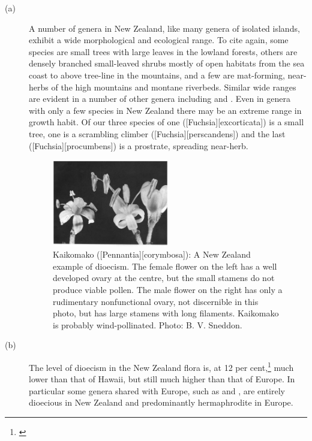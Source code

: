 \begin{description}
\item[{(a)}]A number of genera in New Zealand, like many genera of isolated islands, exhibit a wide morphological and ecological range.
To cite  again, some species are small trees with large leaves in the lowland forests, others are densely branched small-leaved shrubs mostly of open habitats from the sea coast to above tree-line in the mountains, and a few are mat-forming, near-herbs of the high mountains and montane riverbeds.
Similar wide ranges are evident in a number of other genera including  and .
Even in genera with only a few species in New Zealand there may be an extreme range in growth habit.
Of our three species of  one ([Fuchsia][excorticata]) is a small tree, one is a scrambling climber ([Fuchsia][perscandens]) and the last ([Fuchsia][procumbens]) is a prostrate, spreading near-herb.
\begin{figure}
	\includegraphics[width=0.5\textwidth]{graphics/figure4kaikomako.jpg}
	\centering
	\caption[Kaikomako: A New Zealand example of dioecism]{Kaikomako ([Pennantia][corymbosa]): A New Zealand example of dioecism.
	The female flower on the left has a well developed ovary at the centre, but the small stamens do not produce viable pollen.
	The male flower on the right has only a rudimentary nonfunctional ovary, not discernible in this photo, but has large stamens with long filaments.
	Kaikomako is probably wind-pollinated.
	Photo: B. V. Sneddon.}%
	\label{fig:4kaikomako}
\end{figure}
\item[{(b)}]The level of dioecism in the New Zealand flora is, at 12 per cent,\footnote{\cite{godley1979flower}} much lower than that of Hawai{\okina}i, but still much higher than that of Europe.
In particular some genera shared with Europe, such as  and , are entirely dioecious in New Zealand and predominantly hermaphrodite in Europe.

\end{description}
